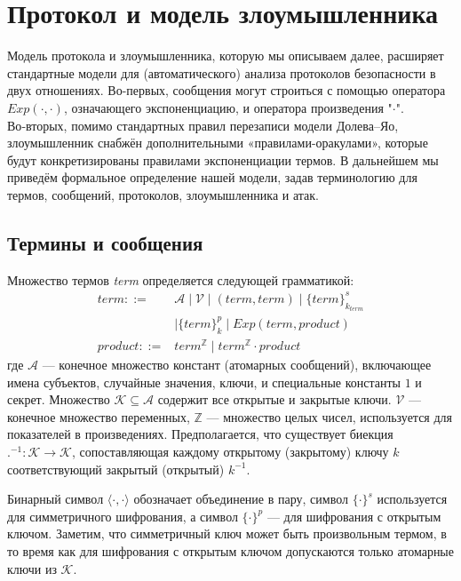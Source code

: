 \section{Протокол и модель злоумышленника}

Модель протокола и злоумышленника, которую мы описываем далее, расширяет стандартные модели для (автоматического) анализа протоколов безопасности
\cite{Amadio2002} в двух отношениях. Во-первых, сообщения могут строиться с помощью
оператора $Exp(\cdot,\cdot)$, означающего экспоненциацию, и оператора произведения "\(\cdot\)". Во‑вторых, помимо стандартных правил перезаписи
модели Долева–Яо, злоумышленник снабжён дополнительными «правилами-оракулами», которые будут конкретизированы правилами экспоненциации термов.
В дальнейшем мы приведём формальное определение нашей модели, задав терминологию для термов, сообщений, протоколов, злоумышленника и атак.

\subsection{Термины и сообщения}

Множество термов \textit{term} определяется следующей грамматикой:
\[
\begin{array}{rl}
  \mathit{term} ::= & \mathcal{A} \mid \mathcal{V} \mid (\mathit{term}, \mathit{term}) \mid \{\mathit{term}\}^{s}_{k_{\mathit{term}}} \\
                  & \mid \{\mathit{term}\}^{p}_{k} \mid \mathit{Exp}(\mathit{term}, \mathit{product}) \\
\mathit{product} ::= & \mathit{term}^{\mathbb{Z}} \mid \mathit{term}^{\mathbb{Z}} \cdot \mathit{product}
\end{array}
\]
где $\mathcal{A}$ — конечное множество констант (атомарных сообщений), включающее имена субъектов, случайные значения, ключи, и специальные
константы $1$ и секрет. Множество $\mathcal{K} \subseteq \mathcal{A}$ содержит все открытые и закрытые ключи. $\mathcal{V}$ — конечное
множество переменных, $\mathbb{Z}$ — множество целых чисел, используется для показателей в произведениях. Предполагается, что существует биекция
${.}^{-1} : \mathcal{K} \to \mathcal{K}$, сопоставляющая каждому открытому (закрытому) ключу $k$ соответствующий закрытый (открытый) $k^{-1}$.

Бинарный символ $\langle\cdot,\cdot\rangle$ обозначает объединение в пару, символ $\{\cdot\}^{s}$ используется для симметричного шифрования,
а символ $\{\cdot\}^{p}$ — для шифрования с открытым ключом. Заметим, что симметричный ключ может быть произвольным термом, в то время как для
шифрования с открытым ключом допускаются только атомарные ключи из $\mathcal{K}$.

